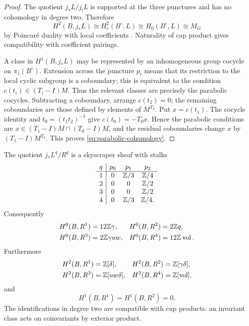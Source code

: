 \begin{proof}
The quotient $j_*L/j_!L$ is supported at the three punctures and has no
cohomology in degree two.  Therefore
\[
 H^2(B,j_*L)\cong H_c^2(B^\circ,L)
 \cong H_0(B^\circ,L)\cong M_G
\]
by Poincaré duality with local coefficients \cite[Ch.~V]{Bredon}.
Naturality of cap product gives compatibility with coefficient pairings.

A class in $H^1(B,j_*L)$ may be represented by an inhomogeneous group
cocycle on $\pi_1(B^\circ)$.  Extension across the puncture $p_i$ means
that its restriction to the local cyclic subgroup is a coboundary; this
is equivalent to the condition $c(t_i)\in(T_i-I)M$.  Thus the relevant
classes are precisely the parabolic cocycles.  Subtracting a coboundary,
arrange $c(t_2)=0$; the remaining coboundaries are those defined by
elements of $M^{T_2}$.  Put
$x=c(t_1)$.  The cocycle identity and $t_0=(t_1t_2)^{-1}$ give
$c(t_0)=-T_0x$.  Hence the parabolic conditions are
$x\in(T_1-I)M\cap(T_0-I)M$, and the residual coboundaries change $x$ by
$(T_1-I)M^{T_2}$.  This proves \eqref{eq:parabolic-cohomology}.
\end{proof}

\begin{proposition}\label{prop:Rq-cohomology}
The quotient $j_*L^q/R^q$ is a skyscraper sheaf with stalks
\[
\begin{array}{c|ccc}
q&p_0&p_1&p_2\\ \hline
1&0&\mathbb Z/3&\mathbb Z/4\\
2&0&0&\mathbb Z/2\\
3&0&0&\mathbb Z/2\\
4&0&\mathbb Z/3&\mathbb Z/4.
\end{array}
\]
Consequently
\begin{align}
 H^0(B,R^1)&=12\mathbb Z\gamma,
 &H^0(B,R^2)&=2\mathbb Z q,
 \label{eq:H0R12}\\
 H^0(B,R^3)&=2\mathbb Z\gamma uw,
 &H^0(B,R^4)&=12\mathbb Z\operatorname{vol}.
 \label{eq:H0R34}
\end{align}
Furthermore
\begin{align}
 H^2(B,R^1)&=\mathbb Z[\delta],
 &H^2(B,R^2)&=\mathbb Z[\gamma\delta],
 \label{eq:H2R12}\\
 H^2(B,R^3)&=\mathbb Z[uw\delta],
 &H^2(B,R^4)&=\mathbb Z[\operatorname{vol}],
 \label{eq:H2R34}
\end{align}
and
\begin{equation}\label{eq:H1-vanishing}
 H^1(B,R^1)=H^1(B,R^2)=0.
\end{equation}
The identifications in degree two are compatible with cup products: an
invariant class acts on coinvariants by exterior product.
\end{proposition}

